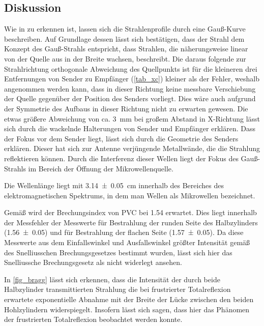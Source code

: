\documentclass[
	a4paper,
	12pt,
	pagesize,
	ngerman
]{scrartcl}
\begin{document}
	\subsection{Diskussion}
	
	Wie in  zu erkennen ist, lassen sich die Strahlenprofile durch eine Gauß-Kurve beschreiben.
	Auf Grundlage dessen lässt sich bestätigen, dass der Strahl dem Konzept des Gauß-Strahls entspricht, dass Strahlen, die näherungsweise linear von der Quelle aus in der Breite wachsen, beschreibt. %
	Die daraus folgende zur Strahlrichtung orthogonale Abweichung des Quellpunkts ist für die kleineren drei Entfernungen von Sender zu Empfänger (\cref{tab_xc}) kleiner als der Fehler, weshalb angenommen werden kann, dass in dieser Richtung keine messbare Verschiebung der Quelle gegenüber der Position des Senders vorliegt.
	Dies wäre auch aufgrund der Symmetrie des Aufbaus in dieser Richtung nicht zu erwarten gewesen.
	Die etwas größere Abweichung von ca. \SI{3}{mm} bei großem Abstand in X-Richtung lässt sich durch die wackelnde Halterungen von Sender und Empfänger erklären.
	Dass der Fokus vor dem Sender liegt, lässt sich durch die Geometrie des Senders erklären.
	Dieser hat sich zur Antenne verjüngende Metallwände, die die Strahlung reflektieren können.
	Durch die Interferenz dieser Wellen liegt der Fokus des Gauß-Strahls im Bereich der Öffnung der Mikrowellenquelle.
	
	Die Wellenlänge liegt mit \SI{3,14\pm 0,05}{cm} innerhalb des Bereiches des elektromagnetischen Spektrums, in dem man Wellen als Mikrowellen bezeichnet.
	
	Gemäß \cite{PVC-Brech} wird der Brechungsindex von PVC bei \SI{1,54}{} erwartet.
	Dies liegt innerhalb der Messfehler der Messwerte für Bestrahlung der runden Seite des Halbzylinders (\SI{1,56\pm 0,05}{}) und für Bestrahlung der flachen Seite (\SI{1,57 \pm 0,05}{}).
	Da diese Messwerte aus dem Einfallswinkel und Ausfallswinkel größter Intensität gemäß des Snelliusschen Brechungsgesetzes bestimmt wurden, lässt sich hier das Snelliussche Brechungsgesetz als nicht widerlegt ansehen. %
	
	In \cref{fig_bragg} lässt sich erkennen, dass die Intensität der durch beide Halbzylinder transmittierten Strahlung die bei frustrierter Totalreflexion erwartete exponentielle Abnahme mit der Breite der Lücke zwischen den beiden Hohlzylindern widerspiegelt.
	Insofern lässt sich sagen, dass hier das Phänomen der frustrierten Totalreflexion beobachtet werden konnte.
	
\end{document}
